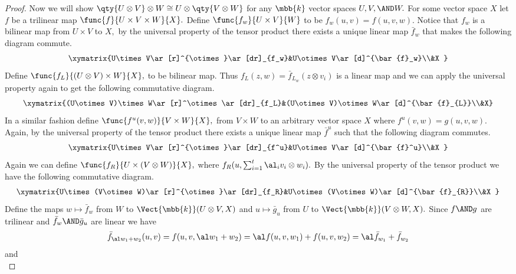 \documentclass[../../main]{subfiles}
\begin{document}
\begin{proof}
Now we will show $ \qty{U\otimes V}\otimes W\cong U\otimes\qty{V\otimes W} $ 
for any $ \mbb{k} $ vector spaces $ U,V,\AND W. $ For some vector space $ X $ 
let $ f $ be a trilinear map $ \func{f}{U\times V\times W}{X}.$ Define
$ \func{f_w}{U\times V}{W} $ to be $ f_w(u,v)=f(u,v,w).$ 
Notice that $ f_w $ is 
a bilinear map from $ U\times V $ to $ X, $ by the universal property of the 
tensor product there exists a unique linear map $ \bar{f}_w $ that makes the 
following diagram commute.
$$
\xymatrix{U\times V\ar[r]^{\otimes}\ar[dr]_{f_w}&U\otimes V\ar[d]^{\bar{f}_w}\\&X
}
$$
Define $ \func{f_L}{(U\otimes V)\times W}{X},$ 
to be bilinear map. Thus $f_L(z,w) 
=\bar{f}_{L_w}(z\otimes 
v_i)$ is a linear map and we can apply the universal property again to get the following 
commutative diagram.
$$
\xymatrix{(U\otimes V)\times W\ar[r]^\otimes\ar[dr]_{f_L}&(U\otimes V)\otimes W\ar[d]^{\bar{f}_{L}}\\&X}
$$
In a similar fashion define $ \func{f^u(v,w)}{V\times W}{X}, $ from $ V\times W $ to an arbitrary 
vector space $ X $ where $ f^u(v,w)=g(u,v,w). $ Again, by the universal 
property of the tensor product there exists a unique linear map $ \bar{f}^u $ 
such that the following diagram commutes.
$$
\xymatrix{U\times V\ar[r]^{\otimes}\ar[dr]_{f^u}&U\otimes V\ar[d]^{\bar{f}^u}\\&X
}
$$
Again we can define $ \func{f_R}{U\times(V\otimes W)}{X}, $
where $ f_R(u,\sum_{i=1}^t\al_iv_i\otimes w_i).$ By the universal property of the 
tensor product we have the following commutative diagram.
$$
\xymatrix{U\times (V\otimes W)\ar[r]^{\otimes}\ar[dr]_{f_R}&U\otimes (V\otimes W)\ar[d]^{\bar{f}_{R}}\\&X
}
$$
Define the maps $ w\mapsto \bar{f}_w  $ from $ W $ to $ \Vect{\mbb{k}} 
(U\otimes V,X)$ and $ u\mapsto \bar{g}_u $ from $ U $ to $ \Vect{\mbb{k}} 
(V\otimes W,X).$ Since $ f\AND g $ are trilinear and $\bar{f}_w \AND \bar{g}_u$ are linear we have
$$
\bar{f}_{\al w_1+w_2}(u,v)=f(u,v,\al w_1+w_2)=\al f(u,v,w_1)+f(u,v,w_2)=\al\bar{f}_{w_1}+\bar{f}_{w_2}
$$
and
$$
$$
\end{proof}
\end{document}
